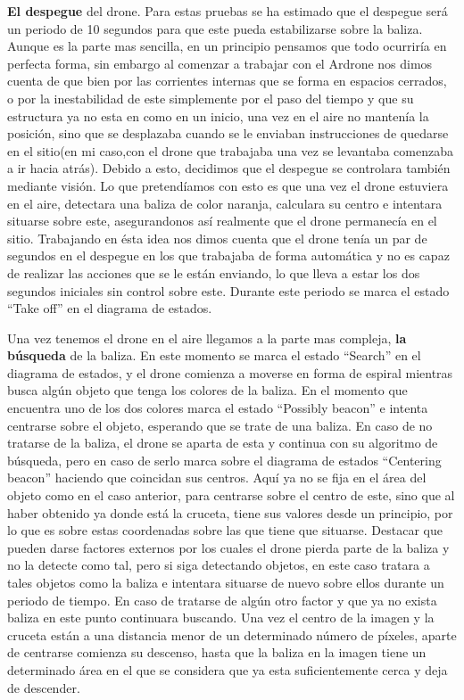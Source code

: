 \hspace{1cm} \textbf{El despegue} del drone. Para estas pruebas se ha estimado que el despegue ser\'a un periodo de 10 segundos para que este pueda estabilizarse sobre la baliza. Aunque es la parte mas sencilla, en un principio pensamos que todo ocurrir\'ia en perfecta forma, sin embargo al comenzar a trabajar con el Ardrone nos dimos cuenta de que bien por las corrientes internas que se forma en espacios cerrados, o por la inestabilidad de este simplemente por el paso del tiempo y que su estructura ya no esta en como en un inicio, una vez en el aire no manten\'ia la posici\'on, sino que se desplazaba cuando se le enviaban instrucciones de quedarse en el sitio(en mi caso,con el drone que trabajaba una vez se levantaba comenzaba a ir hacia atr\'as). Debido a esto, decidimos que el despegue se controlara tambi\'en mediante visi\'on. Lo que pretend\'iamos con esto es que una vez el drone estuviera en el aire, detectara una baliza de color naranja, calculara su centro e intentara situarse sobre este, asegurandonos as\'i realmente que el drone permanec\'ia en el sitio. Trabajando en \'esta idea nos dimos cuenta que el drone ten\'ia un par de segundos en el despegue en los que trabajaba de forma autom\'atica y no es capaz de realizar las acciones que se le est\'an enviando, lo que lleva a estar los dos segundos iniciales sin control sobre este. Durante este periodo se marca el estado "`Take off"' en el diagrama de estados.

\hspace{1cm} Una vez tenemos el drone en el aire llegamos a la parte mas compleja, \textbf{la b\'usqueda} de la baliza. En este momento se marca el estado "`Search"' en el diagrama de estados, y el drone comienza a moverse en forma de espiral mientras busca alg\'un objeto que tenga los colores de la baliza. En el momento que encuentra uno de los dos colores marca el estado "`Possibly beacon"' e intenta centrarse sobre el objeto, esperando que se trate de una baliza. En caso de no tratarse de la baliza, el drone se aparta de esta y continua con su algoritmo de b\'usqueda, pero en caso de serlo marca sobre el diagrama de estados "`Centering beacon"' haciendo que coincidan sus centros. Aqu\'i ya no se fija en el \'area del objeto como en el caso anterior, para centrarse sobre el centro de este, sino que al haber obtenido ya donde est\'a la cruceta, tiene sus valores desde un principio, por lo que es sobre estas coordenadas sobre las que tiene que situarse. Destacar que pueden darse factores externos por los cuales el drone pierda parte de la baliza y no la detecte como tal, pero si siga detectando objetos, en este caso tratara a tales objetos como la baliza e intentara situarse de nuevo sobre ellos durante un periodo de tiempo. En caso de tratarse de alg\'un otro factor y que ya no exista baliza en este punto continuara buscando. Una vez el centro de la imagen y la cruceta est\'an a una distancia menor de un determinado n\'umero de p\'ixeles, aparte de centrarse comienza su descenso, hasta que la baliza en la imagen tiene un determinado \'area en el que se considera que ya esta suficientemente cerca y deja de descender. 

